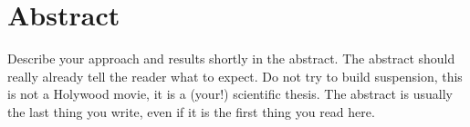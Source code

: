 \chapter{Abstract}
\thispagestyle{empty}
Describe your approach and results shortly in the abstract.
The abstract should really already tell the reader what to expect.
Do not try to  build suspension, this is not a Holywood  movie, it is a
(your!) scientific thesis.  The abstract  is usually the last thing you
write, even if it is the first thing you read here.

